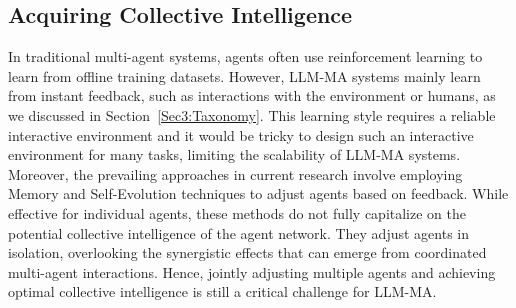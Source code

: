 
\subsection{Acquiring Collective Intelligence}
In traditional multi-agent systems,  agents often use reinforcement learning to learn from offline training datasets.
However, LLM-MA systems mainly learn from instant feedback, such as interactions with the environment or humans, as we discussed in Section~\ref{Sec3:Taxonomy}.
This learning style requires a reliable interactive environment and it would be tricky to design such an interactive environment for many tasks, limiting the scalability of LLM-MA systems. Moreover, the prevailing approaches in current research involve employing Memory and Self-Evolution techniques to adjust agents based on feedback. While effective for individual agents, these methods do not fully capitalize on the potential collective intelligence of the agent network. They adjust agents in isolation, overlooking the synergistic effects that can emerge from coordinated multi-agent interactions. Hence,  jointly adjusting multiple agents and achieving optimal collective intelligence is still a critical challenge for LLM-MA.



